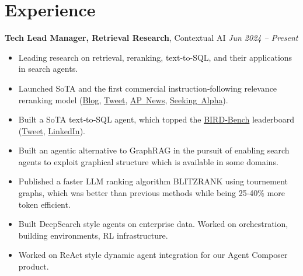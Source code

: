 \documentclass[11pt,a4paper,sans]{moderncv}        %
\begin{document}
\maketitle
\vspace{-25pt}

\section{Experience}
\textbf{Tech Lead Manager, Retrieval Research}, Contextual AI \hfill \textit{Jun 2024 -- Present}
\begin{itemize}
  \item Leading research on retrieval, reranking, text-to-SQL, and their applications in search agents.
  \item Launched SoTA and the first commercial instruction‑following relevance reranking model (\href{https://contextual.ai/blog/introducing-instruction-following-reranker/}{Blog}, \href{https://x.com/douwekiela/status/1899490844572577958}{Tweet}, \href{https://apnews.com/press-release/pr-newswire/contextual-ai-launches-worlds-first-instruction-following-reranker-ecb56585dc31bee5968c13d7000f30b3}{AP~News}, \href{https://seekingalpha.com/pr/20030352-contextual-ai-launches-worlds-first-instruction-following-reranker}{Seeking~Alpha}).
  \item Built a SoTA text‑to‑SQL agent, which topped the \href{https://bird-bench.github.io/}{BIRD‑Bench} leaderboard (\href{https://x.com/apsdehal/status/1895561744120234399}{Tweet}, \href{https://www.linkedin.com/feed/update/urn:li:activity:7301377754749353984/}{LinkedIn}).
  \item Built an agentic alternative to GraphRAG in the pursuit of enabling search agents to exploit graphical structure which is available in some domains.
  \item Published a faster LLM ranking algorithm BLITZRANK using tournement graphs, which was better than previous methods while being 25-40\% more token efficient.
  \item Built DeepSearch style agents on enterprise data. Worked on orchestration, building environments, RL infrastructure.
  \item Worked on ReAct style dynamic agent integration for our Agent Composer product.
\end{itemize}
\vspace{5pt}
\end{document}
